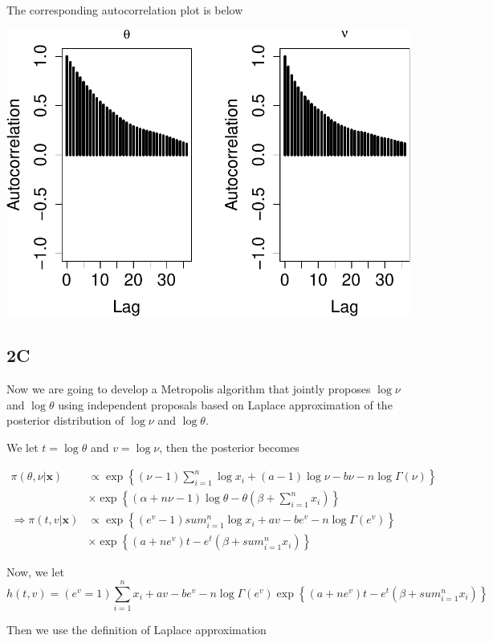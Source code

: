 \documentclass[]{article}
\begin{document}
The corresponding autocorrelation plot is below

\includegraphics{AMS206b_H4_files/figure-latex/unnamed-chunk-22-1.pdf}

\subsection{2C}\label{c}

Now we are going to develop a Metropolis algorithm that jointly proposes
\(\log\nu\) and \(\log\theta\) using independent proposals based on
Laplace approximation of the posterior distribution of \(\log\nu\) and
\(\log\theta\).

We let \(t=\log\theta\) and \(v =\log\nu\), then the posterior becomes

\begin{align*} 
\pi(\theta,\nu|\pmb{x}) &\propto \exp\left\{(\nu -1) \sum_{i=1}^n \log x_i +(a -1)\log\nu - b\nu -n\log\Gamma(\nu) \right\}\\
&\times \exp\left\{(\alpha +n\nu-1)\log\theta -\theta\left(\beta + \sum_{i=1}^n x_i \right)\right\}\\
\Rightarrow \pi(t,v|\pmb{x}) &\propto \exp\left\{(e^v -1) sum_{i=1}^n \log x_i + av - be^v -n\log \Gamma(e^v)\right\}\\
&\times \exp\left\{(a +ne^v)t - e^t\left(\beta + sum_{i=1}^n x_i\right) \right\}
\end{align*}

Now, we let
\[h(t,v) = (e^v =1)\sum_{i=1}^n x_i + av -be^v-n\log \Gamma(e^v)\exp\left\{(a +ne^v)t - e^t\left(\beta + sum_{i=1}^n x_i\right) \right\}\]

Then we use the definition of Laplace approximation
\end{document}
